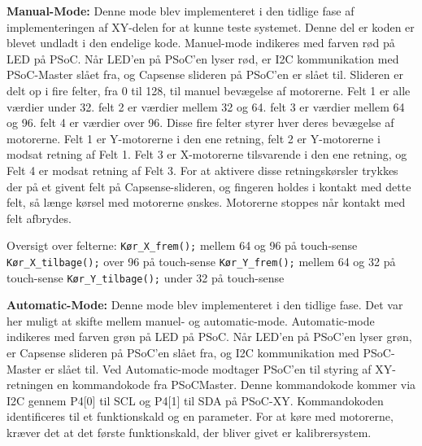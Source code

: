 \textbf{Manual-Mode:}\newline
Denne mode blev implementeret i den tidlige fase af implementeringen af XY-delen for at kunne teste systemet. Denne del er koden er blevet undladt i den endelige kode.\newline
Manuel-mode indikeres med farven rød på LED på PSoC.\newline 
Når LED’en på PSoC’en lyser rød, er I2C kommunikation med PSoC-Master slået fra, og Capsense slideren på PSoC’en er slået til. 
Slideren er delt op i fire felter, fra 0 til 128, til manuel bevægelse af motorerne.  Felt 1 er alle værdier under 32. felt 2 er værdier mellem 32 og 64. felt 3 er værdier mellem 64 og 96. felt 4 er værdier over 96.
Disse fire felter styrer hver deres bevægelse af motorerne. Felt 1 er Y-motorerne i den ene retning, felt 2 er Y-motorerne i modsat retning af Felt 1. Felt 3 er X-motorerne tilsvarende i den ene retning, og Felt 4 er modsat retning af Felt 3. 
For at aktivere disse retningskørsler trykkes der på et givent felt på Capsense-slideren, og fingeren holdes i kontakt med dette felt, så længe kørsel med motorerne ønskes. Motorerne stoppes når kontakt med felt afbrydes.\newline 

Oversigt over felterne:\newline
\verb+Kør_X_frem();+       mellem 64 og 96 på touch-sense\newline
\verb+Kør_X_tilbage();+      over 96 på touch-sense\newline
\verb+Kør_Y_frem();+	   mellem 64 og 32 på touch-sense\newline
\verb+Kør_Y_tilbage();+	     under 32 på touch-sense\newline

\textbf{Automatic-Mode:}\newline
Denne mode blev implementeret i den tidlige fase. Det var her muligt at skifte mellem manuel- og automatic-mode.\newline
Automatic-mode indikeres med farven grøn på LED på PSoC.\newline 
Når LED’en på PSoC’en lyser grøn, er Capsense slideren på PSoC’en slået fra, og I2C kommunikation med PSoC-Master er slået til. 
Ved Automatic-mode modtager PSoC’en til styring af XY-retningen en kommandokode fra PSoCMaster. Denne kommandokode kommer via I2C gennem  P4[0] til SCL og P4[1] til SDA på PSoC-XY.
Kommandokoden identificeres til et funktionskald og en parameter. For at køre med motorerne, kræver det at det første funktionskald, der bliver givet er kalibrer\textunderscore{}system. 

